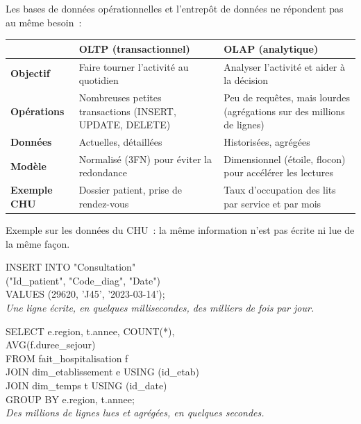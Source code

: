 \noindent Les bases de données opérationnelles et l'entrepôt de données ne répondent pas au même besoin~:
\begin{center}
\begin{tabularx}{\textwidth}{>{\bfseries}l X X}
\toprule
 & OLTP (transactionnel) & OLAP (analytique) \\
\midrule
Objectif & Faire tourner l'activité au quotidien & Analyser l'activité et aider à la décision \\
Opérations & Nombreuses petites transactions (INSERT, UPDATE, DELETE) & Peu de requêtes, mais lourdes (agrégations sur des millions de lignes) \\
Données & Actuelles, détaillées & Historisées, agrégées \\
Modèle & Normalisé (3FN) pour éviter la redondance & Dimensionnel (étoile, flocon) pour accélérer les lectures \\
Exemple CHU & Dossier patient, prise de rendez-vous & Taux d'occupation des lits par service et par mois \\
\bottomrule
\end{tabularx}
\end{center}

\noindent Exemple sur les données du CHU~: la même information n'est pas écrite ni lue de la même façon.

\begin{center}
\begin{minipage}[t]{0.47\textwidth}
\begin{tcolorbox}[colback=gray!5,colframe=gray!60,title=\textbf{OLTP}~: base PostgreSQL,fonttitle=\small,boxsep=2pt]
\ttfamily\scriptsize
INSERT INTO "Consultation"\\
\hspace*{1em}("Id\_patient", "Code\_diag", "Date")\\
VALUES (29620, 'J45', '2023-03-14');\\[0.2cm]
\normalfont\itshape Une ligne écrite, en quelques millisecondes, des milliers de fois par jour.
\end{tcolorbox}
\end{minipage}\hfill
\begin{minipage}[t]{0.47\textwidth}
\begin{tcolorbox}[colback=title2!6,colframe=title1,title=\textbf{OLAP}~: entrepôt Hive,fonttitle=\small,boxsep=2pt]
\ttfamily\scriptsize
SELECT e.region, t.annee, COUNT(*),\\
\hspace*{1em}AVG(f.duree\_sejour)\\
FROM fait\_hospitalisation f\\
JOIN dim\_etablissement e USING (id\_etab)\\
JOIN dim\_temps t USING (id\_date)\\
GROUP BY e.region, t.annee;\\[0.2cm]
\normalfont\itshape Des millions de lignes lues et agrégées, en quelques secondes.
\end{tcolorbox}
\end{minipage}
\end{center}

